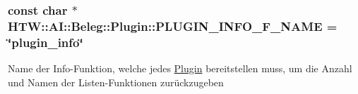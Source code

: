 \hypertarget{namespace_h_t_w_1_1_a_i_1_1_beleg_1_1_plugin_ae1feecb2d4486345d2cb0ce3bed02d63}{
\subsubsection[{P\-L\-U\-G\-I\-N\-\_\-\-I\-N\-F\-O\-\_\-\-F\-\_\-\-N\-A\-M\-E}]{\setlength{\rightskip}{0pt plus 5cm}const char $\ast$ H\-T\-W\-::\-A\-I\-::\-Beleg\-::\-Plugin\-::\-P\-L\-U\-G\-I\-N\-\_\-\-I\-N\-F\-O\-\_\-\-F\-\_\-\-N\-A\-M\-E = \char`\"{}plugin\-\_\-info\char`\"{}}}\label{namespace_h_t_w_1_1_a_i_1_1_beleg_1_1_plugin_ae1feecb2d4486345d2cb0ce3bed02d63}
Name der Info-\/\-Funktion, welche jedes \hyperlink{namespace_h_t_w_1_1_a_i_1_1_beleg_1_1_plugin}{Plugin} bereitstellen muss, um die Anzahl und Namen der Listen-\/\-Funktionen zurückzugeben 